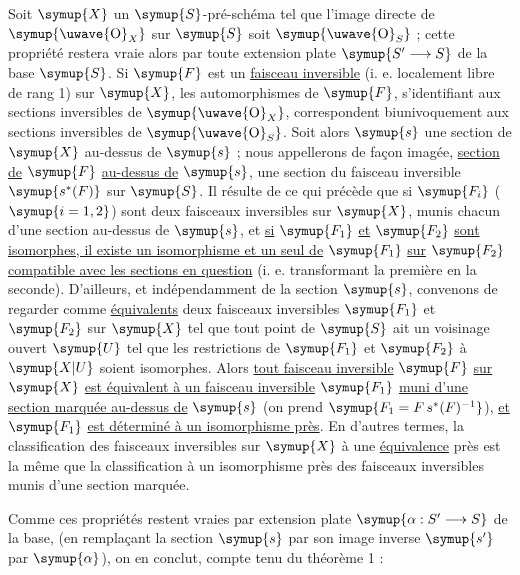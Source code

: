  Soit $\symup{X}$ un $\symup{S}$-pré-schéma tel que l'image directe de $\symup{\text{\uwave{O}}_X}$ sur $\symup{S}$
soit $\symup{\text{\uwave{O}}_S}$ ; cette propriété restera vraie alors par toute extension
plate $\symup{S'\longrightarrow S}$ de la base $\symup{S}$. Si $\symup{F}$ est un \uline{faisceau inversible}
(i. e. localement libre de rang 1) sur $\symup{X}$, les automorphismes de $\symup{F}$,
s'identifiant aux sections inversibles de $\symup{\text{\uwave{O}}_X}$, correspondent
biunivoquement aux sections inversibles de $\symup{\text{\uwave{O}}_S}$. Soit alors $\symup{s}$ une
section de $\symup{X}$ au-dessus de $\symup{s}$ ; nous appellerons de façon imagée, \uline{section de}
$\symup{F}$ \uline{au-dessus de} $\symup{s}$, une section du faisceau inversible $\symup{s^*(F)}$ sur $\symup{S}$. Il
résulte de ce qui précède que si $\symup{F_i}$ ($\symup{i=1,2}$) sont deux faisceaux inversibles
sur $\symup{X}$, munis chacun d'une section au-dessus de $\symup{s}$, et \uline{si} $\symup{F_1}$ \uline{et} $\symup{F_2}$ \uline{sont
isomorphes, il existe un isomorphisme et un seul de} $\symup{F_1}$ \uline{sur} $\symup{F_2}$ \uline{compatible
avec les sections en question} (i. e. transformant la première en la seconde).
D'ailleurs, et indépendamment de la section $\symup{s}$, convenons de regarder comme
\uline{équivalents} deux faisceaux inversibles $\symup{F_1}$ et $\symup{F_2}$ sur $\symup{X}$ tel que tout
point de $\symup{S}$ ait un voisinage ouvert $\symup{U}$ tel que les restrictions de $\symup{F_1}$ et
$\symup{F_2}$ à $\symup{X|U}$ soient isomorphes. Alors \uline{tout faisceau inversible} $\symup{F}$ \uline{sur} $\symup{X}$ \uline{est
équivalent à un faisceau inversible} $\symup{F_1}$ \uline{muni d'une section marquée au-dessus
de} $\symup{s}$ (on prend $\symup{F_1=F\,s^*(F)^{-1}}$), \uline{et} $\symup{F_1}$ \uline{est déterminé à un
isomorphisme près}. En d'autres termes, la classification des faisceaux
inversibles sur $\symup{X}$ à une \uline{équivalence} près est la même que la classification à
un isomorphisme près des faisceaux inversibles munis d'une section marquée.

Comme ces propriétés restent vraies par extension plate
$\symup{\alpha:S'\longrightarrow S}$ de la base, (en remplaçant la section $\symup{s}$ par son
image inverse $\symup{s'}$ par $\symup{\alpha}$), on en conclut, compte tenu du théorème 1 :

